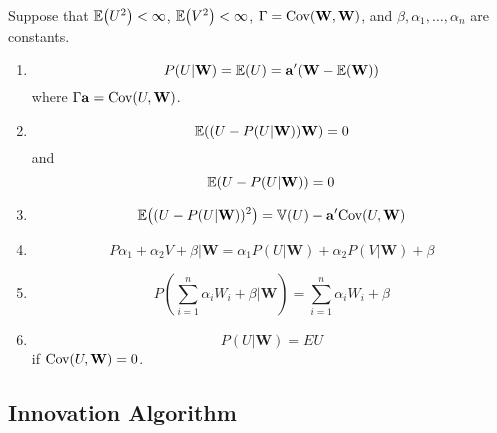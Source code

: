 \begin{defn}
  \label{defn:stationary_processes:1}
  Suppose that $\E{U^{2}} < \infty$, $\E{V^{2}} < \infty$, $\Gamma =
  \Cov{\mathbf{W}}{\mathbf{W}}$, and $\beta, \alpha_{1}, \dots,
  \alpha_{n}$ are constants.

  \begin{enumerate}
  \item
    \begin{equation}
      P(U | \mathbf{W}) = \E{U} = \mathbf{a}'(\mathbf{W} - \E{\mathbf{W}})
    \end{equation}
    where $\Gamma \mathbf{a} = \Cov{U}{\mathbf{W}}$.
  \item
    \begin{equation}
      \E{(U - P(U | \mathbf{W})) \mathbf{W}} = 0
    \end{equation} and
    \begin{equation}
      \E{U - P(U | \mathbf{W})} = 0
    \end{equation}
  \item
    \begin{equation}
      \E{(U - P(U | \mathbf{W}))^{2}} = \Var{U} - \mathbf{a}' \Cov{U}{\mathbf{W}}
    \end{equation}
  \item
    \begin{equation}
      P{\alpha_{1} + \alpha_{2} V + \beta | \mathbf{W}} = \alpha_{1}
      P(U| \mathbf{W}) + \alpha_{2} P(V | \mathbf{W}) + \beta
    \end{equation}
  \item
    \begin{equation}
      P(\sum_{i=1}^{n} \alpha_{i} W_{i} + \beta | \mathbf{W}) =
      \sum_{i=1}^{n} \alpha_{i} W_{i} + \beta
    \end{equation}
  \item
    \begin{equation}
      \label{eq:15}
      P(U | \mathbf{W}) = E{U}
    \end{equation} if $\Cov{U}{\mathbf{W}} = 0$.
  \end{enumerate}
\end{defn}

\subsection{Innovation Algorithm}
\label{sec:innovation-algorithm}

